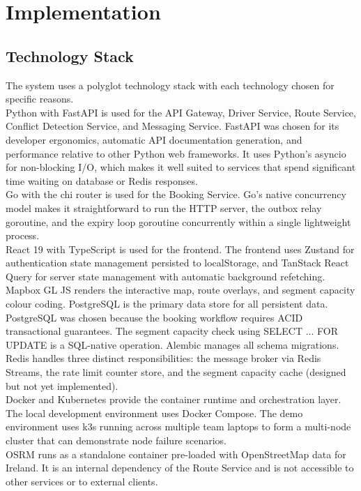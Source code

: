 \documentclass{article}
\begin{document}
\section{Implementation}
\subsection{Technology Stack}
The system uses a polyglot technology stack with each technology chosen for specific reasons. \\
Python with FastAPI is used for the API Gateway, Driver Service, Route Service, Conflict Detection Service, and Messaging Service. FastAPI was chosen for its developer ergonomics, automatic API documentation generation, and performance relative to other Python web frameworks. It uses Python's asyncio for non-blocking I/O, which makes it well suited to services that spend significant time waiting on database or Redis responses.\\
Go with the chi router is used for the Booking Service. Go's native concurrency model makes it straightforward to run the HTTP server, the outbox relay goroutine, and the expiry loop goroutine concurrently within a single lightweight process.\\
React 19 with TypeScript is used for the frontend. The frontend uses Zustand for authentication state management persisted to localStorage, and TanStack React Query for server state management with automatic background refetching. Mapbox GL JS renders the interactive map, route overlays, and segment capacity colour coding.
PostgreSQL is the primary data store for all persistent data. \\
PostgreSQL was chosen because the booking workflow requires ACID transactional guarantees. The segment capacity check using SELECT ... FOR UPDATE is a SQL-native operation. Alembic manages all schema migrations.\\

Redis handles three distinct responsibilities: the message broker via Redis Streams, the rate limit counter store, and the segment capacity cache (designed but not yet implemented). \\

Docker and Kubernetes provide the container runtime and orchestration layer. The local development environment uses Docker Compose. The demo environment uses k3s running across multiple team laptops to form a multi-node cluster that can demonstrate node failure scenarios. \\
OSRM runs as a standalone container pre-loaded with OpenStreetMap data for Ireland. It is an internal dependency of the Route Service and is not accessible to other services or to external clients.
\end{document}
